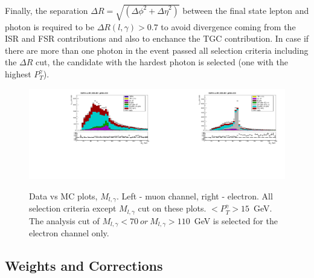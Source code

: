Finally, the separation $\Delta R=\sqrt{({\Delta\phi}^2+{\Delta\eta}^2)}$ between the final state lepton and photon is required to be $\Delta R(l,\gamma)>0.7$ to avoid divergence coming from the ISR and FSR contributions and also to enchance the TGC contribution. In case if there are more than one photon in the event passed all selection criteria including the $\Delta R$ cut, the candidate with the hardest photon is selected (one with the highest $P_T^{\gamma}$). 

\begin{figure}[htb]
  \begin{center}
   \includegraphics[width=0.5\textwidth]{../figs/figs_v11/MUON_WGamma/PrepareYields/c_TotalDATAvsMC_EtaCommon__Mpholep1_pt15to500_.pdf}\includegraphics[width=0.5\textwidth]{../figs/figs_v11/ELECTRON_WGamma/PrepareYields/c_TotalDATAvsMC_EtaCommon__Mpholep1PRELIMINARY_FOR_E_TO_GAMMA_WITH_PSV_CUT_pt15to500_.pdf}
  \caption{Data vs MC plots, $M_{l,\gamma}$. Left - muon channel, right - electron. All selection criteria except $M_{l,\gamma}$ cut on these plots. $<P_T^{\gamma}>15$~GeV. The analysis cut of $M_{l,\gamma}<70~or~M_{l,\gamma}>110$~GeV is selected for the electron channel only.}
  \label{fig:DATAvsMC_Mpholep1}
  \end{center}
\end{figure}

\subsection{Weights and Corrections}

